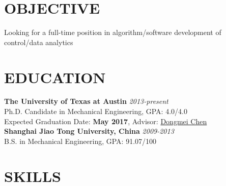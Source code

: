 \documentclass[margin, 9pt]{res}
\begin{document}
\begin{resume}


\vspace*{-5pt}


\section{OBJECTIVE}
Looking for a full-time position in algorithm/software development of control/data analytics


\vspace*{-10pt}
\section{EDUCATION}

\textbf{The University of Texas at Austin} \hfill\textit{2013-present}\\
Ph.D. Candidate in Mechanical Engineering, GPA: 4.0/4.0\\
Expected Graduation Date: \textbf{May 2017},  Advisor: \href{http://www.me.utexas.edu/~apscl/people.html}{Dongmei Chen}\\

\vspace*{-10pt}
\textbf{Shanghai Jiao Tong University, China} \hfill\textit{2009-2013}\\
B.S. in Mechanical Engineering, GPA: 91.07/100\\

\vspace*{-10pt}
\section{SKILLS}


\end{resume}
\end{document}
